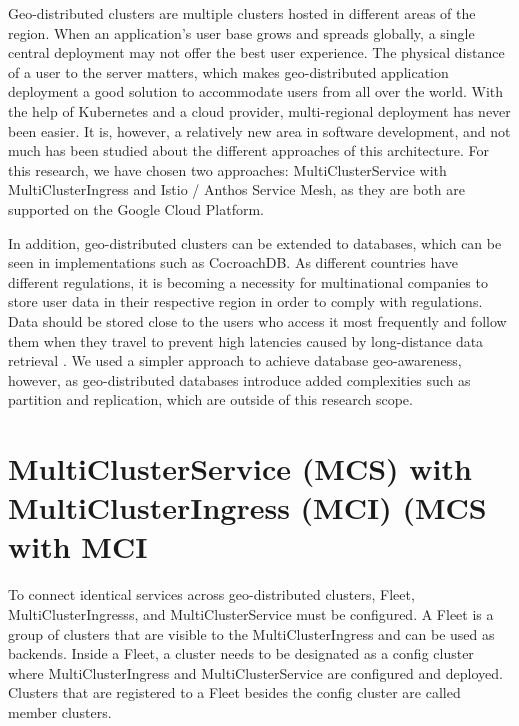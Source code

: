 Geo-distributed clusters are multiple clusters hosted in different areas of the region. When an application's user base grows and spreads globally, a single central deployment may not offer the best user experience. The physical distance of a user to the server matters, which makes geo-distributed application deployment a good solution to accommodate users from all over the world. With the help of Kubernetes and a cloud provider, multi-regional deployment has never been easier. It is, however, a relatively new area in software development, and not much has been studied about the different approaches of this architecture. For this research, we have chosen two approaches: MultiClusterService with MultiClusterIngress and Istio / Anthos Service Mesh, as they are both are supported on the Google Cloud Platform.

In addition, geo-distributed clusters can be extended to databases, which can be seen in implementations such as CocroachDB. As different countries have different regulations, it is becoming a necessity for multinational companies to store user data in their respective region in order to comply with regulations. Data should be stored close to the users who access it most frequently and follow them when they travel to prevent high latencies caused by long-distance data retrieval \citep{taft-2020}. We used a simpler approach to achieve database geo-awareness, however, as geo-distributed databases introduce added complexities such as partition and replication, which are outside of this research scope.



\section{MultiClusterService (MCS) with MultiClusterIngress (MCI) (MCS with MCI}
To connect identical services across geo-distributed clusters, Fleet, MultiClusterIngresss, and MultiClusterService must be configured. A Fleet is a group of clusters that are visible to the MultiClusterIngress and can be used as backends. Inside a Fleet, a cluster needs to be designated as a config cluster where MultiClusterIngress and MultiClusterService are configured and deployed. Clusters that are registered to a Fleet besides the config cluster are called member clusters. 

